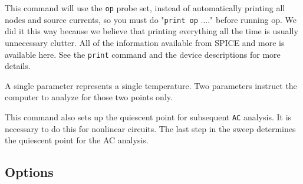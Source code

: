 This command will use the {\tt op} probe set, instead of automatically
printing all nodes and source currents, so you must do "{\tt print
op} ...." before running op.  We did it this way because we believe
that printing everything all the time is usually unnecessary clutter.
All of the information available from SPICE and more is available
here.  See the {\tt print} command and the device descriptions for
more details.

A single parameter represents a single temperature.  Two parameters instruct
the computer to analyze for those two points only.

This command also sets up the quiescent point for subsequent {\tt AC}
analysis.  It is necessary to do this for nonlinear circuits.  The last step
in the sweep determines the quiescent point for the AC analysis.
\subsection{Options}

